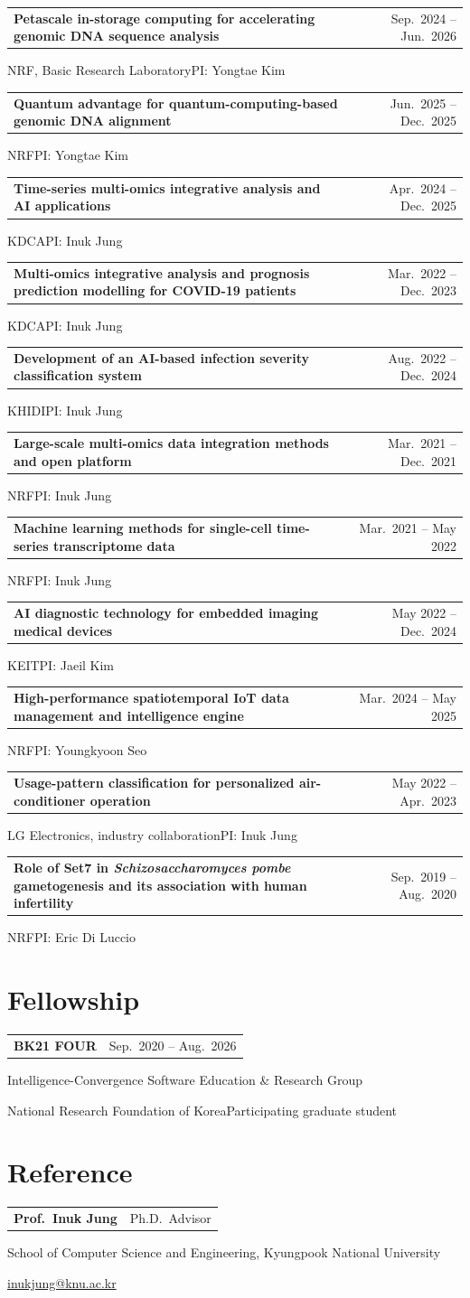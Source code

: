 \documentclass[11pt,a4paper]{article}
\makeatletter
\newcommand{\entry}[2]{\begin{tabularx}{\linewidth}{@{}>{\raggedright\arraybackslash}X r@{}}\textbf{#1}&\small\color{accent}#2\end{tabularx}\par}
\newcommand{\project}[4]{\vspace{3pt}\entry{#1}{#2}{\small #3\enspace\textbullet\enspace PI: #4}\par}
\makeatother
\begin{document}
\project{Petascale in-storage computing for accelerating genomic DNA sequence analysis}
  {Sep.\ 2024 -- Jun.\ 2026}{NRF, Basic Research Laboratory}{Yongtae Kim}
\project{Quantum advantage for quantum-computing-based genomic DNA alignment}
  {Jun.\ 2025 -- Dec.\ 2025}{NRF}{Yongtae Kim}
\project{Time-series multi-omics integrative analysis and AI applications}
  {Apr.\ 2024 -- Dec.\ 2025}{KDCA}{Inuk Jung}
\project{Multi-omics integrative analysis and prognosis prediction modelling for COVID-19 patients}
  {Mar.\ 2022 -- Dec.\ 2023}{KDCA}{Inuk Jung}
\project{Development of an AI-based infection severity classification system}
  {Aug.\ 2022 -- Dec.\ 2024}{KHIDI}{Inuk Jung}
\project{Large-scale multi-omics data integration methods and open platform}
  {Mar.\ 2021 -- Dec.\ 2021}{NRF}{Inuk Jung}
\project{Machine learning methods for single-cell time-series transcriptome data}
  {Mar.\ 2021 -- May 2022}{NRF}{Inuk Jung}
\project{AI diagnostic technology for embedded imaging medical devices}
  {May 2022 -- Dec.\ 2024}{KEIT}{Jaeil Kim}
\project{High-performance spatiotemporal IoT data management and intelligence engine}
  {Mar.\ 2024 -- May 2025}{NRF}{Youngkyoon Seo}
\project{Usage-pattern classification for personalized air-conditioner operation}
  {May 2022 -- Apr.\ 2023}{LG Electronics, industry collaboration}{Inuk Jung}
\project{Role of Set7 in \emph{Schizosaccharomyces pombe} gametogenesis and its association with human infertility}
  {Sep.\ 2019 -- Aug.\ 2020}{NRF}{Eric Di Luccio}

\section{Fellowship}
\entry{BK21 FOUR}{Sep.\ 2020 -- Aug.\ 2026}
Intelligence-Convergence Software Education \& Research Group\par
National Research Foundation of Korea\enspace\textbullet\enspace Participating graduate student

\section{Reference}
\entry{Prof.\ Inuk Jung}{Ph.D.\ Advisor}
School of Computer Science and Engineering, Kyungpook National University\par
\href{mailto:inukjung@knu.ac.kr}{inukjung@knu.ac.kr}
\end{document}
